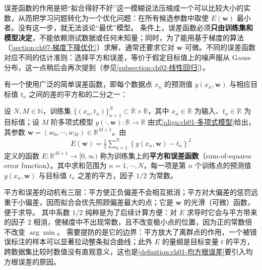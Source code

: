 \documentclass[../../main.tex]{subfiles}
\begin{document}
\begin{remark}
误差函数的作用是把“拟合得好不好”这一模糊说法压缩成一个可以比较大小的实数，从而把学习问题转化为一个优化问题：在所有候选参数中取使 $E(\mathbf{w})$ 最小者。没有这一步，就无法谈论“最优”模型。
条件上，误差函数必须\textbf{只由训练集和模型决定}，不能依赖测试数据或任何未知量；同时，为了能用基于梯度的算法（\cref{section:ch07-梯度下降优化}）求解，通常还要求它对 $\mathbf{w}$ 可微。不同的误差函数对应不同的估计准则：选择平方和误差，等价于假定目标值上的噪声服从 Gauss 分布，这一点稍后会再次提到（参见\cref{subsection:ch02-线性回归}）。
\end{remark}

有一个使用广泛的简单误差函数，即每个数据点 $x_n$ 的预测值 $y(x_n,\mathbf{w})$ 与相应目标值 $t_n$ 之间的差的平方和的二分之一：

\begin{definition}[平方和误差函数]\label{definition:ch01-平方和误差函数}
设 $N,M\in\mathbb{N}$，训练集 $\{(x_n,t_n)\}_{n=1}^{N}\subset\mathbb{R}\times\mathbb{R}$，其中 $x_n\in\mathbb{R}$ 为输入、$t_n\in\mathbb{R}$ 为目标值；设 $M$ 阶多项式模型 $y(\cdot,\mathbf{w}):\mathbb{R}\to\mathbb{R}$ 由式\eqref{align:ch01-多项式模型}给出，其参数 $\mathbf{w}=(w_0,\cdots,w_M)\in\mathbb{R}^{M+1}$。由
\begin{align}
  E(\mathbf{w}) = \frac{1}{2} \sum_{n=1}^{N} \left\{ y(x_n, \mathbf{w}) - t_n \right\}^2
  \label{align:ch01-平方和误差}
\end{align}
定义的函数 $E:\mathbb{R}^{M+1}\to[0,\infty)$ 称为训练集上的\textbf{平方和误差函数}（sum-of-squares error function）。其中求和范围为 $n=1,\cdots,N$，每一项是第 $n$ 个训练点的预测值 $y(x_n,\mathbf{w})$ 与目标值 $t_n$ 之差的平方，因子 $1/2$ 为常数。
\end{definition}

\begin{remark}
平方和误差的动机有三层：平方使正负偏差不会相互抵消；平方对大偏差的惩罚远重于小偏差，因而拟合会优先照顾偏差最大的点；它是 $\mathbf{w}$ 的光滑（可微）函数，便于求导。
其中系数 $1/2$ 纯粹是为了后续计算方便：对 $E$ 求导时它会与平方带来的因子 $2$ 相消，使梯度中不出现常数，且不改变极小点的位置，因为正的常数倍不改变 $\arg\min$。
需要提防的是它的边界：平方放大了离群点的作用，一个被错误标注的样本可以显著拉动整条拟合曲线；此外 $E$ 的量纲是目标变量 $t$ 的平方，跨数据集比较时数值没有直观意义，这也是\cref{definition:ch01-均方根误差}要引入均方根误差的原因。
\end{remark}
\end{document}
